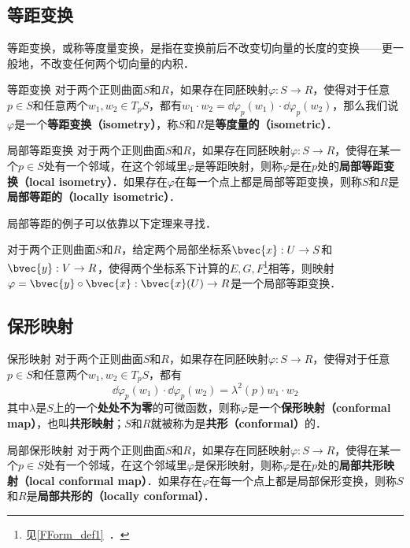 
\subsection{等距变换}
等距变换，或称等度量变换，是指在变换前后不改变切向量的长度的变换——更一般地，不改变任何两个切向量的内积．

\begin{definition}{等距变换}
对于两个正则曲面$S$和$R$，如果存在同胚映射$\varphi:S\to R$，使得对于任意$p\in S$和任意两个$w_1, w_2\in T_pS$，都有$w_1\cdot w_2=\dd\varphi_p(w_1)\cdot\dd\varphi_p(w_2)$，那么我们说$\varphi$是一个\textbf{等距变换（isometry）}，称$S$和$R$是\textbf{等度量的（isometric）}．
\end{definition}

\begin{definition}{局部等距变换}
对于两个正则曲面$S$和$R$，如果存在同胚映射$\varphi:S\to R$，使得在某一个$p\in S$处有一个邻域，在这个邻域里$\varphi$是等距映射，则称$\varphi$是在$p$处的\textbf{局部等距变换（local isometry）}．如果存在$\varphi$在每一个点上都是局部等距变换，则称$S$和$R$是\textbf{局部等距的（locally isometric）}．
\end{definition}

局部等距的例子可以依靠以下定理来寻找．

\begin{theorem}{}
对于两个正则曲面$S$和$R$，给定两个局部坐标系$\bvec{x}:U\to S$和$\bvec{y}:V\to R$，使得两个坐标系下计算的$E, G, F$\footnote{见\autoref{FForm_def1}~．}相等，则映射$\varphi=\bvec{y}\circ\bvec{x}:\bvec{x}(U)\to R$是一个局部等距变换．
\end{theorem}

\subsection{保形映射}

\begin{definition}{保形映射}
对于两个正则曲面$S$和$R$，如果存在同胚映射$\varphi:S\to R$，使得对于任意$p\in S$和任意两个$w_1, w_2\in T_pS$，都有\begin{equation}
\dd\varphi_p(w_1)\cdot\dd\varphi_p(w_2)=\lambda^2(p)w_1\cdot w_2
\end{equation}
其中$\lambda$是$S$上的一个\textbf{处处不为零}的可微函数，则称$\varphi$是一个\textbf{保形映射（conformal map）}，也叫\textbf{共形映射}；$S$和$R$就被称为是\textbf{共形（conformal）}的．
\end{definition}

\begin{definition}{局部保形映射}
对于两个正则曲面$S$和$R$，如果存在同胚映射$\varphi:S\to R$，使得在某一个$p\in S$处有一个邻域，在这个邻域里$\varphi$是保形映射，则称$\varphi$是在$p$处的\textbf{局部共形映射（local conformal map）}．如果存在$\varphi$在每一个点上都是局部保形变换，则称$S$和$R$是\textbf{局部共形的（locally conformal）}．
\end{definition}



